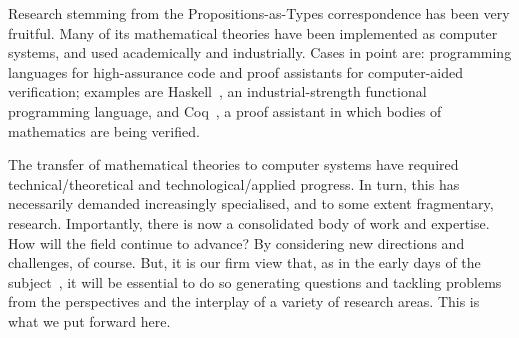 \documentclass[11pt,twocolumn]{article}
\begin{document}
Research stemming from the Propositions-as-Types correspondence has been
very fruitful.  Many of its mathematical theories have been implemented as
computer systems, and used academically and industrially.  Cases in point
are: programming languages for high-assurance code and proof assistants
for computer-aided verification; examples %
are Haskell~\cite{Haskell},
an industrial-strength functional programming language, 
and Coq~\cite{Coq}, 
a proof assistant in which bodies of mathematics are being verified.


The transfer of mathematical theories to computer systems have required
technical/theoretical and technological/applied progress.  In turn, this
has necessarily demanded increasingly specialised, and to some extent
fragmentary, research.  Importantly, there is now a consolidated body of
work and expertise.  How will the field continue to advance?  By
considering new directions and challenges, of course.  But, it is our firm
view that, as in the early days of the
subject~\cite{deBruijn,LawvereAinF,ScottCV,MartinLofITT}, %
it will be essential to do so generating questions and tackling problems
from the perspectives and the interplay of a variety of research areas.
This is %
what we put forward here.

\end{document}
